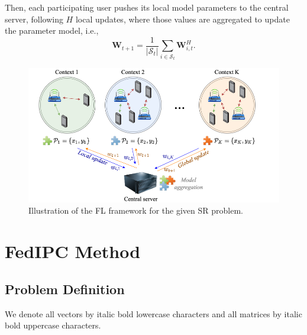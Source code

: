 \documentclass[journal]{IEEEtran}
\begin{document}
 Then, each participating user pushes its local model parameters to the central server, following $H$ local updates, where those values are aggregated to update the parameter model, i.e.,
\begin{equation}
\boldsymbol{W}_{t+1}=\frac{1}{ \vert \mathcal{S}_{t} \vert}\sum_{i\in\mathcal{S}_{t}} \boldsymbol{W}^{H}_{i,t}.
\end{equation}
\begin{figure}[h]
\begin{center}
\includegraphics[scale=0.35]{FL_example_ITU.png}
\caption{Illustration of the FL framework for the given SR problem.}
\label{fl_fig}
\end{center}
\end{figure}


\section{FedIPC Method}
\subsection{Problem Definition}
We denote all vectors by italic bold lowercase characters and all matrices by italic bold uppercase characters.
\end{document}
